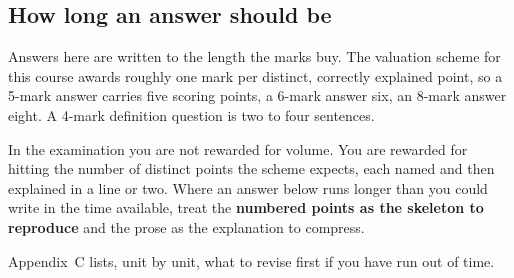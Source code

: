 \subsection*{How long an answer should be}

Answers here are written to the length the marks buy. The valuation scheme for
this course awards roughly one mark per distinct, correctly explained point,
so a 5-mark answer carries five scoring points, a 6-mark answer six, an 8-mark
answer eight. A 4-mark definition question is two to four sentences.

In the examination you are not rewarded for volume. You are rewarded for
hitting the number of distinct points the scheme expects, each named and then
explained in a line or two. Where an answer below runs longer than you could
write in the time available, treat the \textbf{numbered points as the skeleton
to reproduce} and the prose as the explanation to compress.

\vspace{4pt}
Appendix~C lists, unit by unit, what to revise first if you have run out of
time.
